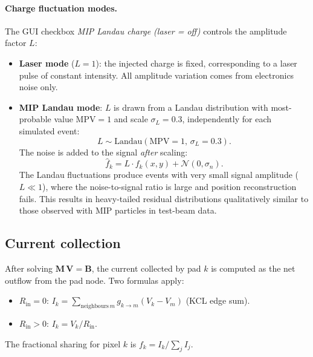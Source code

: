 \documentclass[preprint,numbers,1p]{elsarticle}
\begin{document}
\paragraph{Charge fluctuation modes.}
The GUI checkbox \emph{MIP Landau charge (laser = off)} controls the amplitude factor $L$:

\begin{itemize}
  \item \textbf{Laser mode} ($L=1$): the injected charge is fixed, corresponding to a laser
        pulse of constant intensity. All amplitude variation comes from electronics noise only.
  \item \textbf{MIP Landau mode}: $L$ is drawn from a Landau distribution with most-probable
        value $\mathrm{MPV}=1$ and scale $\sigma_L = 0.3$, independently for each simulated
        event:
        \begin{equation}
          L \sim \mathrm{Landau}(\mathrm{MPV}=1,\,\sigma_L=0.3).
        \end{equation}
        The noise is added to the signal \emph{after} scaling:
        \begin{equation}
          \hat{f}_k = L\cdot f_k(x,y) + \mathcal{N}(0,\sigma_n).
        \end{equation}
        The Landau fluctuations produce events with very small signal amplitude ($L \ll 1$),
        where the noise-to-signal ratio is large and position reconstruction fails.
        This results in heavy-tailed residual distributions qualitatively similar to those
        observed with MIP particles in test-beam data.
\end{itemize}

\subsection{Current collection}
\label{sec:collection}

After solving $\mathbf{M}\,\mathbf{V} = \mathbf{B}$, the current collected by pad $k$ is
computed as the net outflow from the pad node. Two formulas apply:

\begin{itemize}
  \item $R_\mathrm{in} = 0$: $I_k = \sum_{\mathrm{neighbours}\,m} g_{k\to m}(V_k - V_m)$
        (KCL edge sum).
  \item $R_\mathrm{in} > 0$: $I_k = V_k / R_\mathrm{in}$.
\end{itemize}

The fractional sharing for pixel $k$ is $f_k = I_k / \sum_j I_j$.
\end{document}
